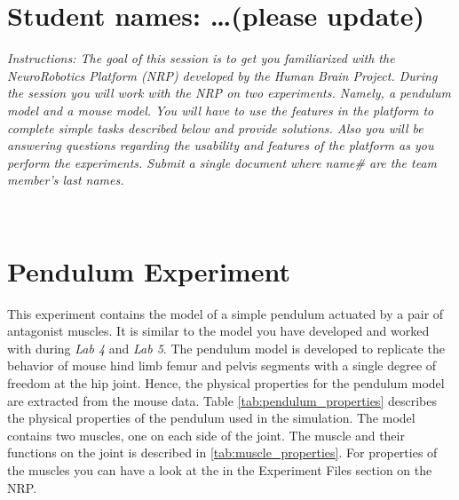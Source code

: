 \documentclass{cmc}
\begin{document}
\pagestyle{fancy}
 

\section*{Student names: \ldots (please update)}

\textit{Instructions: The goal of this session is to get you
  familiarized with the NeuroRobotics Platform (NRP) developed by the
  Human Brain Project.  During the session you will work with the NRP
  on two experiments. Namely, a pendulum model and a mouse model. You
  will have to use the features in the platform to complete simple
  tasks described below and provide solutions. Also you will be
  answering questions regarding the usability and features of the
  platform as you perform the experiments. \textbf{} Submit a single document
   where name\# are the
  team member’s last names.  }  \\ {
  \\

  \section*{Pendulum Experiment}
  \label{sec:pendulum-experiment}

  This experiment contains the model of a simple pendulum actuated by
  a pair of antagonist muscles. It is similar to the model you have
  developed and worked with during \textit{Lab 4} and \textit{Lab
    5}. The pendulum model is developed to replicate the behavior of
  mouse hind limb femur and pelvis segments with a single degree of
  freedom at the hip joint. Hence, the physical properties for the
  pendulum model are extracted from the mouse data. Table
  \ref{tab:pendulum_properties} describes the physical properties of
  the pendulum used in the simulation. The model contains two muscles,
  one on each side of the joint. The muscle and their functions on the
  joint is described in \ref{tab:muscle_properties}. For properties of
  the muscles you can have a look at the
   in the Experiment Files section on
  the NRP.


}
\end{document}
